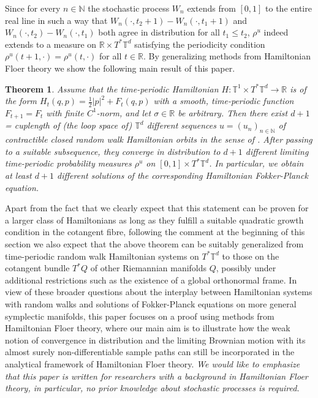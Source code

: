 \documentclass[a4paper,11pt]{amsart}
\newcommand{\NN}{\mathbb{N}}
\newcommand{\RR}{\mathbb{R}}
\newcommand{\TT}{\mathbb{T}}
\newtheorem{theorem}{Theorem}[section]
\begin{document}
\indent Since for every $n\in\NN$ the stochastic process $W_n$ extends from $[0,1]$ to the entire real line in such a way that $W_n(\cdot,t_2+1)-W_n(\cdot,t_1+1)$ and $W_n(\cdot,t_2)-W_n(\cdot,t_1)$ both agree in distribution for all $t_1\leq t_2$, $\rho^u$ indeed extends to a measure on $\RR\times T^*\TT^d$ satisfying the periodicity condition $\rho^u(t+1,\cdot)=\rho^u(t,\cdot)$ for all $t\in\RR$.
By generalizing methods from Hamiltonian Floer theory we show the following main result of this paper.
\begin{theorem}\label{main}
Assume that the time-periodic Hamiltonian $H:\TT^1\times T^*\TT^d\to\RR$ is of the form $H_t(q,p)=\frac{1}{2}|p|^2+F_t(q,p)$ with a smooth, time-periodic function $F_{t+1}=F_t$ with finite $C^1$-norm, and let $\sigma\in\RR$ be arbitrary. Then there exist $d+1$ = cuplength of (the loop space of) $\TT^d$ different sequences $u=(u_n)_{n\in\NN}$ of contractible closed random walk Hamiltonian orbits in the sense of . After passing to a suitable subsequence, they converge in distribution to $d+1$ different limiting time-periodic probability measures $\rho^u$ on $[0,1]\times T^*\TT^d$. In particular, we obtain at least $d+1$ different solutions of the corresponding Hamiltonian Fokker-Planck equation. 
\end{theorem}
Apart from the fact that we clearly expect that this statement can be proven for a larger class of Hamiltonians as long as they fulfill a suitable quadratic growth condition in the cotangent fibre, following the comment at the beginning of this section we also expect that the above theorem can be suitably generalized from time-periodic random walk Hamiltonian systems on $T^*\TT^d$ to those on the cotangent bundle $T^*Q$ of other Riemannian manifolds $Q$, possibly under additional restrictions such as the existence of a global orthonormal frame. In view of these broader questions about the interplay between Hamiltonian systems with random walks and solutions of Fokker-Planck equations on more general symplectic manifolds, this paper focuses on a proof using methods from Hamiltonian Floer theory, where our main aim is to illustrate how the weak notion of convergence in distribution and the limiting Brownian motion with its almost surely non-differentiable sample paths can still be incorporated in the analytical framework of Hamiltonian Floer theory. \emph{We would like to emphasize that this paper is written for researchers with a background in Hamiltonian Floer theory, in particular, no prior knowledge about stochastic processes is required.}
\end{document}
